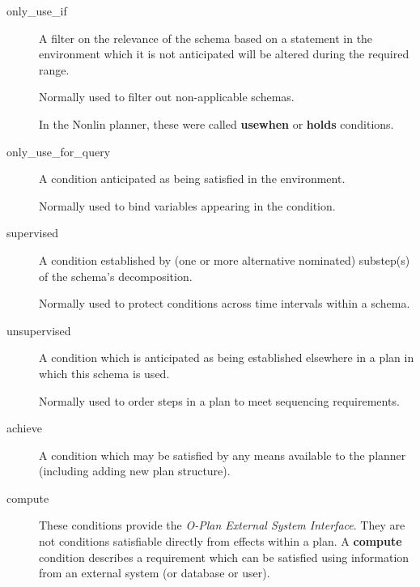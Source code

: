 \begin{description}

\item[only\_use\_if]
A filter on the relevance of the schema based on a statement
in the environment which it is not anticipated will be altered
during the required range.

Normally used to filter out non-applicable schemas.

In the Nonlin planner, these were called {\bf usewhen} or
{\bf holds} conditions.
 
 

\item[only\_use\_for\_query]
A condition anticipated as being satisfied in the environment.

Normally used to bind variables appearing in the condition.

\item[supervised]
A condition established by (one or more alternative nominated)
substep(s) of the schema's decomposition.

Normally used to protect conditions across time intervals within
a schema.

\item[unsupervised]
A condition which is anticipated as being established elsewhere in
a plan in which this schema is used.

Normally used to order steps in a plan to meet sequencing requirements.

\item[achieve]
A condition which may be satisfied by any means available to
the planner (including adding new plan structure).

\item[compute]
These conditions provide the {\em O-Plan External System Interface}.  They
are not conditions satisfiable directly from effects within a plan.  A {\bf
compute} condition describes a requirement which can be satisfied using
information from an external system (or database or user).

\end{description}

